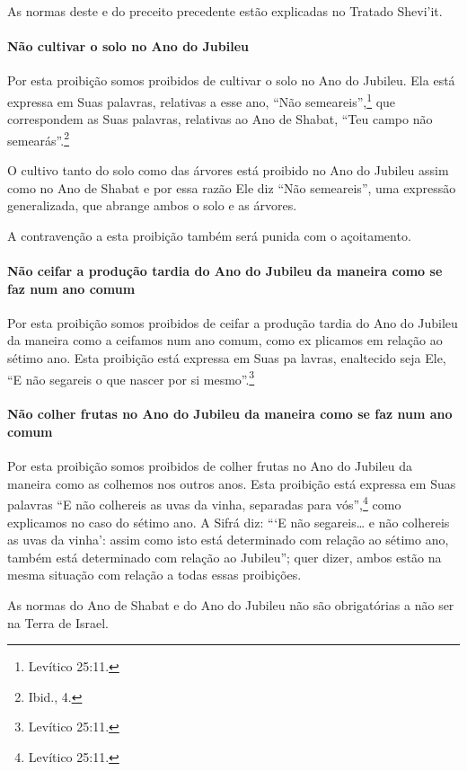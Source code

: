 \begin{multicols}{2}
As normas deste e do preceito precedente estão explicadas no Tratado Shevi'it\starr.

\paragraph{Não cultivar o solo no Ano do Jubileu}

Por esta proibição somos proibidos de cultivar o solo no Ano do Jubileu.
Ela está expressa em Suas palavras, relativas a esse ano, ``Não
semeareis'',\footnote{Levítico 25:11.} que correspondem as Suas palavras,
relativas ao Ano de Shabat, ``Teu campo não semearás''.\footnote{Ibid., 4.}

O cultivo tanto do solo como das árvores está proibido no Ano do Jubileu
assim como no Ano de Shabat e por essa razão Ele diz ``Não semeareis'',
uma expressão generalizada, que abrange ambos o solo e as árvores.

A contravenção a esta proibição também será punida com o açoitamento.

\paragraph{Não ceifar a produção tardia do Ano do Jubileu da maneira como se
faz num ano comum}

Por esta proibição somos proibidos de ceifar a produção tardia do Ano do
Jubileu da maneira como a ceifamos num ano comum, como ex plicamos em
relação ao sétimo ano. Esta proibição está expressa em Suas pa lavras,
enaltecido seja Ele, ``E não segareis o que nascer por si mesmo''.\footnote{Levítico 25:11.}

\paragraph{Não colher frutas no Ano do Jubileu da maneira como se faz num ano comum}

Por esta proibição somos proibidos de colher frutas no Ano do Jubileu da
maneira como as colhemos nos outros anos. Esta proibição está expressa
em Suas palavras ``E não colhereis as uvas da vinha, separadas para
vós'',\footnote{Levítico 25:11.} como explicamos no caso do sétimo ano. A Sifrá\starr{}
diz: ```E não segareis\ldots{} e não colhereis as uvas da vinha': assim como
isto está determinado com relação ao sétimo ano, também está determinado
com relação ao Jubileu''; quer dizer, ambos estão na mesma situação com
relação a todas essas proibições.

As normas do Ano de Shabat e do Ano do Jubileu não são obrigatórias a
não ser na Terra de Israel.


\end{multicols}
